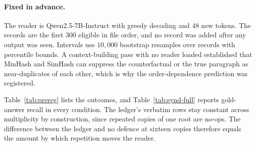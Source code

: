 \documentclass{article}
\begin{document}
\paragraph{Fixed in advance.} The reader is Qwen2.5-7B-Instruct
\citep{qwen2025qwen25} with greedy decoding and $48$ new tokens. The records are
the first $300$ eligible in file order, and no record was added after any output
was seen. Intervals use $10{,}000$ bootstrap resamples over records with
percentile bounds. A context-building pass with no reader loaded established
that MinHash and SimHash can suppress the counterfactual or the true paragraph
as near-duplicates of each other, which is why the order-dependence prediction
was registered.

\begin{table}[h]
\centering\small
\caption{Pre-registered predictions and their outcomes. Differences are paired
over the $300$ records. All $\SyndHeld$ of $\SyndPredictions$ predictions
hold.}
\label{tab:prereg}
\end{table}

Table~\ref{tab:prereg} lists the outcomes, and Table~\ref{tab:synd-full} reports
gold-answer recall in every condition. The ledger's verbatim rows stay constant
across multiplicity by construction, since repeated copies of one root are
no-ops. The difference between the ledger and no defence at sixteen copies
therefore equals the amount by which repetition moves the reader.
\end{document}
